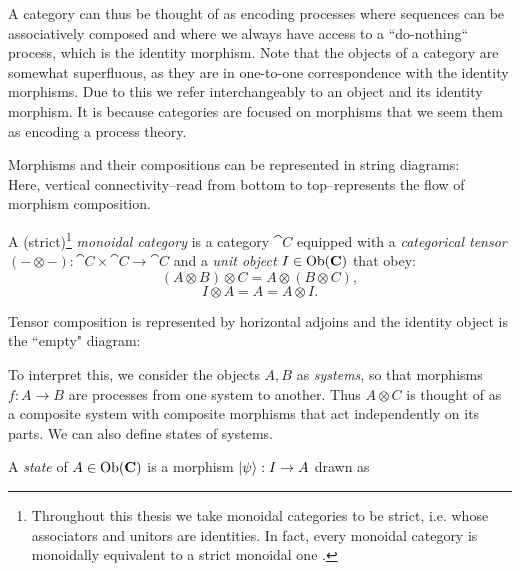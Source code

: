A category can thus be thought of as encoding processes where sequences can be associatively composed  and where we always have access to a ``do-nothing`` process, which is the identity morphism. Note that the objects of a category are somewhat superfluous, as they are in one-to-one correspondence with the identity morphisms. Due to this we refer interchangeably to an object and its identity morphism. It is because categories are focused on morphisms that we seem them as encoding a process theory.

Morphisms and their compositions can be represented in string diagrams:
\begin{equation}
\label{eq:composition}

\end{equation}
\noindent Here, vertical connectivity--read from bottom to top--represents the flow of morphism composition.

\begin{defn}
A (strict)\footnote{Throughout this thesis we take monoidal categories to be strict, i.e. whose associators and unitors are identities.  In fact, every monoidal category is monoidally equivalent to a strict monoidal one \cite{joyal1993braided}.} \emph{monoidal category} is a category $\cat{C}$ equipped with a \emph{categorical tensor} $(-\otimes-):\cat{C}\times\cat{C}\to\cat{C}$ and a \emph{unit object} $I\in\mbox{Ob}(\mathbf{C})$ that obey:
\begin{equation}
(A\otimes B)\otimes C = A\otimes(B\otimes C),
\end{equation}
\begin{equation}
I\otimes A = A = A\otimes I.
\end{equation}
\end{defn}

Tensor composition is represented by horizontal adjoins and the identity object is the ``empty" diagram:
\begin{equation}
\label{eq:tensor}

\end{equation}

To interpret this, we consider the objects $A,B$ as \emph{systems}, so that morphisms $f:A\to B$ are processes from one system to another. Thus $A\otimes C$ is thought of as a composite system with composite morphisms that act independently on its parts. We can also define states of systems.

\begin{defn}
\label{defn:state}
A \emph{state} of $A\in\mbox{Ob}(\mathbf{C})$ is a morphism $| \psi \rangle:I\to A$ drawn as
\begin{equation}
\label{eq:state}

\end{equation}
\end{defn}

